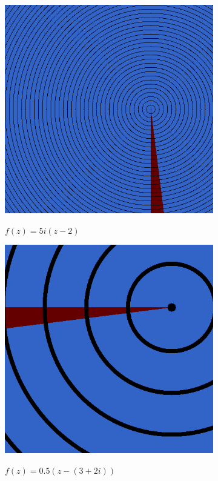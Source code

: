 \documentclass[xhtml, mathjax]{article}
\begin{document}
    \begin{figure}
      \centering
      \begin{subfigure}{0.5\textwidth}
        \centering
        \includegraphics{linear_1.gif}\par
        $f(z)=5i(z-2)$
      \end{subfigure}
      \begin{subfigure}{0.5\linewidth}
        \centering
        \includegraphics{linear_2.gif}\par
        $f(z)=0.5(z-(3+2i))$
      \end{subfigure}
    \end{figure}

  
\end{document}
